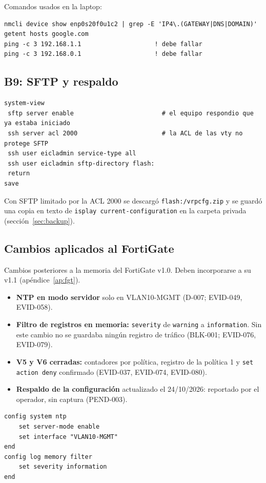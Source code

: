 \documentclass[11pt,a4paper]{article}
\newcommand{\fn}[1]{\texttt{\fnbreaks#1\fnend}}
\def\fnbreaks#1\fnend{\begingroup\fnactive\scantokens{#1\noexpand}\endgroup}
\gdef\fnactive{\catcode`\-=\active\catcode`\/=\active
  \def-{\char`\-\allowbreak}\def/{\char`\/\allowbreak}\let\_\fnus}
\newcommand{\fnus}{\textunderscore\allowbreak}
\begin{document}
Comandos usados en la laptop:
\begin{lstlisting}
nmcli device show enp0s20f0u1c2 | grep -E 'IP4\.(GATEWAY|DNS|DOMAIN)'
getent hosts google.com
ping -c 3 192.168.1.1                    ! debe fallar
ping -c 3 192.168.0.1                    ! debe fallar
\end{lstlisting}

\subsection{B9: SFTP y respaldo}
\begin{lstlisting}
system-view
 sftp server enable                        # el equipo respondio que ya estaba iniciado
 ssh server acl 2000                       # la ACL de las vty no protege SFTP
 ssh user eicladmin service-type all
 ssh user eicladmin sftp-directory flash:
 return
save
\end{lstlisting}

Con SFTP limitado por la ACL 2000 se descargó \texttt{flash:/vrpcfg.zip} y se guardó una copia en texto de \fn{display current-configuration} en la carpeta privada (sección~\ref{sec:backup}).

\subsection{Cambios aplicados al FortiGate}\label{sec:fgt}
Cambios posteriores a la memoria del FortiGate v1.0. Deben incorporarse a su v1.1 (apéndice~\ref{ap:fgt}).

\begin{itemize}
  \item \textbf{NTP en modo servidor} solo en VLAN10-MGMT (D-007; EVID-049, EVID-058).
  \item \textbf{Filtro de registros en memoria:} \texttt{severity} de \texttt{warning} a \texttt{information}. Sin este cambio no se guardaba ningún registro de tráfico (BLK-001; EVID-076, EVID-079).
  \item \textbf{V5 y V6 cerradas:} contadores por política, registro de la política 1 y \texttt{set action deny} confirmado (EVID-037, EVID-074, EVID-080).
  \item \textbf{Respaldo de la configuración} actualizado el 24/10/2026: reportado por el operador, sin captura (PEND-003).
\end{itemize}

\begin{lstlisting}
config system ntp
    set server-mode enable
    set interface "VLAN10-MGMT"
end
config log memory filter
    set severity information
end
\end{lstlisting}
\end{document}
